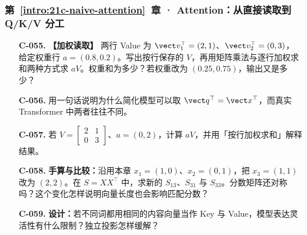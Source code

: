 \subsubsection*{第~\ref*{intro:21c-naive-attention}~章 · Attention：从直接读取到 Q/K/V 分工}
\begin{enumerate}[label={},leftmargin=4.8em,itemsep=4pt]
\item[\textbf{C-055.}] \leavevmode{}\label{exercise:C-055}\label{exercise:weighted-value-read}\textbf{【加权读取】} 两行 Value 为 $\vect v_1^\top=(2,1)$、$\vect v_2^\top=(0,3)$，给定权重行 $a=(0.8,0.2)$。写出按行保存的 $V$，再用矩阵乘法与逐行加权求和两种方式求 $aV$。权重和为多少？若权重改为 $(0.25,0.75)$，输出又是多少？
\item[\textbf{C-056.}] \leavevmode{}\label{exercise:C-056}\label{exercise:query-projection-choice}用一句话说明为什么简化模型可以取 $\vect q^\top=\vect x^\top$，而真实 Transformer 中两者往往不同。
\item[\textbf{C-057.}] \leavevmode{}\label{exercise:C-057}\label{exercise:unnormalized-value-read}若 $V=\begin{bmatrix}2&1\\0&3\end{bmatrix}$、$a=(0,2)$，计算 $aV$，并用「按行加权求和」解释结果。
\item[\textbf{C-058.}] \leavevmode{}\label{exercise:C-058}\label{exercise:self-dot-length}\textbf{手算与比较：}沿用本章 $x_1=(1,0)$、$x_2=(0,1)$，把 $x_3=(1,1)$ 改为 $(2,2)$。在 $S=XX^\top$ 中，求新的 $S_{13}$、$S_{31}$ 与 $S_{33}$。分数矩阵还对称吗？这个变化怎样说明向量长度也会影响匹配分数？
\item[\textbf{C-059.}] \leavevmode{}\label{exercise:C-059}\label{exercise:key-value-projections}\textbf{设计：}若不同词都用相同的内容向量当作 Key 与 Value，模型表达灵活性有什么限制？独立投影怎样缓解？
\end{enumerate}
